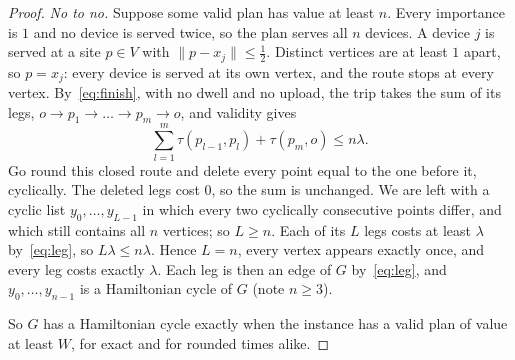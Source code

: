 \begin{proof}
\emph{No to no.} Suppose some valid plan has value at least $n$. Every
importance is $1$ and no device is served twice, so the plan serves all $n$
devices. A device $j$ is served at a site $p\in V$ with
$\lVert p-x_j\rVert\le\tfrac12$. Distinct vertices are at least $1$ apart,
so $p=x_j$: every device is served at its own vertex, and the route stops at
every vertex. By~\eqref{eq:finish}, with no dwell and no upload, the trip
takes the sum of its legs, $o\to p_1\to\dots\to p_m\to o$, and validity
gives
\[
  \textstyle\sum_{l=1}^{m}\tau(p_{l-1},p_l)+\tau(p_m,o)\le n\lambda.
\]
Go round this closed route and delete every point equal to the one before
it, cyclically. The deleted legs cost $0$, so the sum is unchanged. We are
left with a cyclic list $y_0,\dots,y_{L-1}$ in which every two cyclically
consecutive points differ, and which still contains all $n$ vertices; so
$L\ge n$. Each of its $L$ legs costs at least $\lambda$
by~\eqref{eq:leg}, so $L\lambda\le n\lambda$. Hence $L=n$, every vertex
appears exactly once, and every leg costs exactly $\lambda$. Each leg is
then an edge of $G$ by~\eqref{eq:leg}, and $y_0,\dots,y_{n-1}$ is a
Hamiltonian cycle of $G$ (note $n\ge3$).

So $G$ has a Hamiltonian cycle exactly when the instance has a valid plan
of value at least $W$, for exact and for rounded times alike.
\end{proof}

